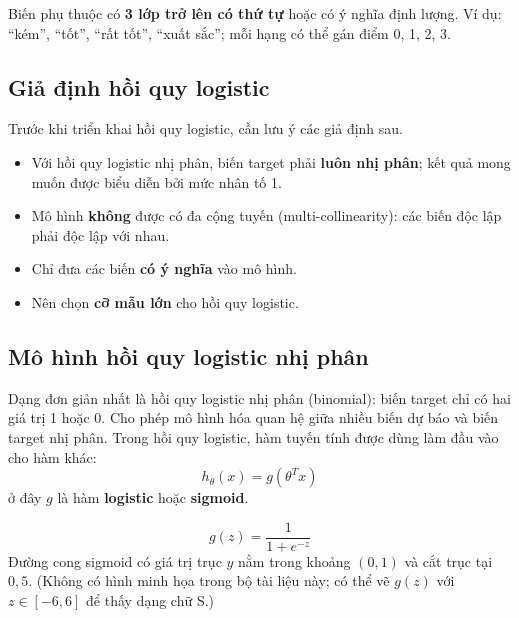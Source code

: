 \begin{dinhnghia}[title={Thứ bậc (Ordinal)}]
Biến phụ thuộc có \textbf{3 lớp trở lên có thứ tự} hoặc có ý nghĩa định lượng.
Ví dụ: ``kém'', ``tốt'', ``rất tốt'', ``xuất sắc''; mỗi hạng có thể gán điểm 0, 1, 2, 3.
\end{dinhnghia}

\subsection{Giả định hồi quy logistic}

\begin{luuy}[title={Giả định trước khi triển khai}]
Trước khi triển khai hồi quy logistic, cần lưu ý các giả định sau.
\begin{itemize}
  \item Với hồi quy logistic nhị phân, biến target phải \textbf{luôn nhị phân}; kết quả mong muốn được biểu diễn bởi mức nhân tố 1.
  \item Mô hình \textbf{không} được có đa cộng tuyến (multi-collinearity): các biến độc lập phải độc lập với nhau.
  \item Chỉ đưa các biến \textbf{có ý nghĩa} vào mô hình.
  \item Nên chọn \textbf{cỡ mẫu lớn} cho hồi quy logistic.
\end{itemize}
\end{luuy}

\subsection{Mô hình hồi quy logistic nhị phân}

\begin{dinhnghia}[title={Dạng đơn giản nhất}]
Dạng đơn giản nhất là hồi quy logistic nhị phân (binomial): biến target chỉ có hai giá trị 1 hoặc 0.
Cho phép mô hình hóa quan hệ giữa nhiều biến dự báo và biến target nhị phân.
Trong hồi quy logistic, hàm tuyến tính được dùng làm đầu vào cho hàm khác:
\[
h_{\theta}(x) = g(\theta^{T} x)
\]
ở đây $g$ là hàm \textbf{logistic} hoặc \textbf{sigmoid}.
\end{dinhnghia}

\begin{dinhnghia}[title={Hàm sigmoid}]
\[
g(z) = \frac{1}{1 + e^{-z}}
\]
Đường cong sigmoid có giá trị trục $y$ nằm trong khoảng $(0, 1)$ và cắt trục tại $0{,}5$.
(Không có hình minh họa trong bộ tài liệu này; có thể vẽ $g(z)$ với $z \in [-6, 6]$ để thấy dạng chữ S.)
\end{dinhnghia}

